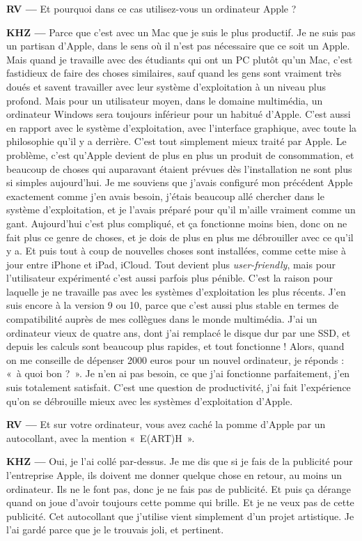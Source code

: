 \documentclass[a4paper,12pt]{article}
\newcommand{\guill}[1]{«~#1~»}
\begin{document}
\textbf{RV ---} Et pourquoi dans ce cas utilisez-vous un ordinateur Apple ?

\textbf{KHZ ---} Parce que c'est avec un Mac que je suis le plus productif. Je ne suis pas un partisan d'Apple, dans le sens où il n'est pas nécessaire que ce soit un Apple. Mais quand je travaille avec des étudiants qui ont un PC plutôt qu'un Mac, c'est fastidieux de faire des choses similaires, sauf quand les gens sont vraiment très doués et savent travailler avec leur système d'exploitation à un niveau plus profond. Mais pour un utilisateur moyen, dans le domaine multimédia, un ordinateur Windows sera toujours inférieur pour un habitué d'Apple. C'est aussi en rapport avec le système d'exploitation, avec l'interface graphique, avec toute la philosophie qu'il y a derrière. C'est tout simplement mieux traité par Apple. Le problème, c'est qu'Apple devient de plus en plus un produit de consommation, et beaucoup de choses qui auparavant étaient prévues dès l'installation ne sont plus si simples aujourd'hui. Je me souviens que j'avais configuré mon précédent Apple exactement comme j'en avais besoin, j'étais beaucoup allé chercher dans le système d'exploitation, et je l'avais préparé pour qu'il m'aille vraiment comme un gant. Aujourd'hui c'est plus compliqué, et ça fonctionne moins bien, donc on ne fait plus ce genre de choses, et je dois de plus en plus me débrouiller avec ce qu'il y a. Et puis tout à coup de nouvelles choses sont installées, comme cette mise à jour entre iPhone et iPad, iCloud. Tout devient plus \emph{user-friendly}, mais pour l'utilisateur expérimenté c'est aussi parfois plus pénible. C'est la raison pour laquelle je ne travaille pas avec les systèmes d'exploitation les plus récents. J'en suis encore à la version 9 ou 10, parce que c'est aussi plus stable en termes de compatibilité auprès de mes collègues dans le monde multimédia. J'ai un ordinateur vieux de quatre ans, dont j'ai remplacé le disque dur par une SSD, et depuis les calculs sont beaucoup plus rapides, et tout fonctionne ! Alors, quand on me conseille de dépenser 2000 euros pour un nouvel ordinateur, je réponds : \guill{à quoi bon ?}. Je n'en ai pas besoin, ce que j'ai fonctionne parfaitement, j'en suis totalement satisfait. C'est une question de productivité, j'ai fait l'expérience qu'on se débrouille mieux avec les systèmes d'exploitation d'Apple.

\textbf{RV ---} Et sur votre ordinateur, vous avez caché la pomme d'Apple par un autocollant, avec la mention \guill{E(ART)H}.

\textbf{KHZ ---} Oui, je l'ai collé par-dessus. Je me dis que si je fais de la publicité pour l'entreprise Apple, ils doivent me donner quelque chose en retour, au moins un ordinateur. Ils ne le font pas, donc je ne fais pas de publicité. Et puis ça dérange quand on joue d'avoir toujours cette pomme qui brille. Et je ne veux pas de cette publicité. Cet autocollant que j'utilise vient simplement d'un projet artistique. Je l'ai gardé parce que je le trouvais joli, et pertinent.
\end{document}
